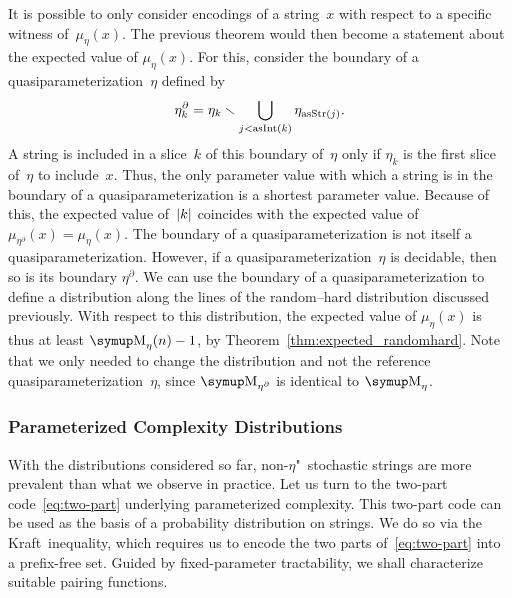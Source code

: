 It is possible to only consider encodings of a string~$x$ with respect to a specific witness of~$\mu_\eta(x)$.
The previous theorem would then become a statement about the expected value of $\mu_\eta(x)$.
For this, consider the boundary of a quasiparameterization~$\eta$ defined by
\begin{equation*}
  \eta^\partial_k = \eta_k \smallsetminus \bigcup_{j < \operatorname{asInt}(k)} \eta_{\operatorname{asStr}(j)}.
\end{equation*}
A string is included in a slice~$k$ of this boundary of~$\eta$ only if $\eta_k$ is the first slice of~$\eta$ to include~$x$.
Thus, the only parameter value with which a string is in the boundary of a quasiparameterization is a shortest parameter value.
Because of this, the expected value of~${\lvert k\rvert}$ coincides with the expected value of~$\mu_{\eta^\partial}(x) = \mu_\eta(x)$.
The boundary of a quasiparameterization is not itself a quasiparameterization.
However, if a quasiparameterization~$\eta$ is decidable, then so is its boundary $\eta^\partial$.
We can use the boundary of a quasiparameterization to define a distribution along the lines of the random--hard distribution discussed previously.
With respect to this distribution, the expected value of $\mu_\eta(x)$ is thus at least $\upM_\eta(n) - 1$, by Theorem~\ref{thm:expected_randomhard}.
Note that we only needed to change the distribution and not the reference quasiparameterization~$\eta$, since $\upM_{\eta^\partial}$ is identical to $\upM_\eta$.

\subsubsection{Parameterized Complexity Distributions}
With the distributions considered so far, non-$\eta$"~stochastic strings are more prevalent than what we observe in practice.
Let us turn to the two-part code~\eqref{eq:two-part} underlying parameterized complexity.
This two-part code can be used as the basis of a probability distribution on strings.
We do so via the Kraft~inequality, which requires us to encode the two parts of~\eqref{eq:two-part} into a prefix-free set.
Guided by fixed-parameter tractability, we shall characterize suitable pairing functions.

